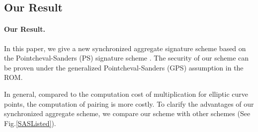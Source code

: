 \documentclass[a4paper,11pt]{fullverllncs}
\begin{document}
\subsection{Our Result}
\paragraph{\bf Our Result.}
In this paper, we give a new synchronized aggregate signature scheme based on the Pointcheval-Sanders (PS) signature scheme \cite{PS16}.
The security of our scheme can be proven under the generalized Pointcheval-Sanders (GPS) assumption  \cite{KLAP21} in the ROM.

In general, compared to the computation cost of multiplication for elliptic curve points, the computation of pairing is more costly.
To clarify the advantages of our synchronized aggregate scheme, we compare our scheme with other schemes (See Fig.\ref{SASListed}).
\end{document}
